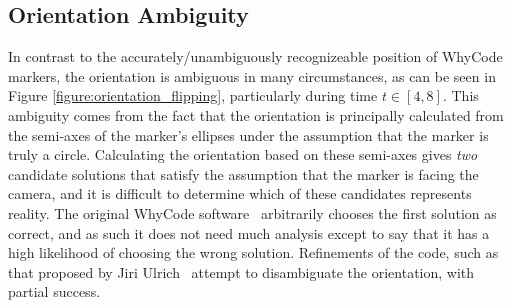 \subsection{Orientation Ambiguity}

In contrast to the accurately/unambiguously recognizeable position of WhyCode markers, the orientation
is ambiguous in many circumstances, as can be seen in Figure \ref{figure:orientation_flipping},
particularly during time $t \in [4,8]$.
This ambiguity comes from the fact that the orientation is principally calculated from the semi-axes of the
marker's ellipses under the assumption that the marker is truly a circle.
Calculating the orientation based on these semi-axes gives \textit{two} candidate solutions
that satisfy the assumption that the marker is facing the camera,
and it is difficult to determine which of these candidates represents reality.
The original WhyCode software~\cite{LCAS_whycon} arbitrarily chooses the first solution as correct,
and as such it does not need much analysis except to say that it has a high likelihood of choosing the wrong solution.
Refinements of the code, such as that proposed by Jiri Ulrich~\cite{julrich_whycon} attempt to disambiguate
the orientation, with partial success.

